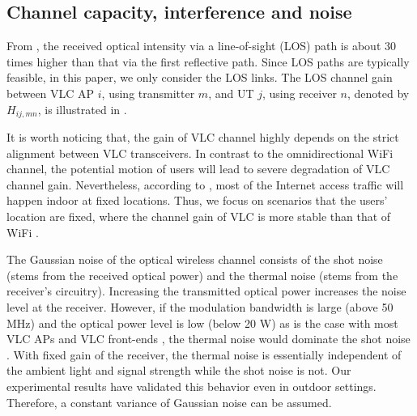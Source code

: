 \documentclass[10pt,journal]{IEEEtran}
\begin{document}
\subsection{Channel capacity, interference and noise}
From \cite{komine2004fundamental}, the received optical intensity via a line-of-sight (LOS) path is about 30 times higher than that via the first reflective path. Since LOS paths are typically feasible, in this paper, we only consider the LOS links. The LOS channel gain between VLC AP $i$, using transmitter $m$, and UT $j$, using receiver $n$, denoted by $H_{ij,mn}$, is illustrated in \cite{komine2004fundamental}.

It is worth noticing that, the gain of VLC channel highly depends on the strict alignment between VLC transceivers. In contrast to the omnidirectional WiFi channel, the potential motion of users will lead to severe degradation of VLC channel gain. Nevertheless, according to \cite{Cisco2015service}, most of the Internet access traffic will happen indoor at fixed locations. Thus, we focus on scenarios that the users' location are fixed, where the channel gain of VLC is more stable than that of WiFi \cite{zhang2015dancing}.

The Gaussian noise of the optical wireless channel consists of the shot noise (stems from the received optical power) and the thermal noise (stems from the receiver's circuitry). Increasing the transmitted optical power increases the noise level at the receiver. However, if the modulation bandwidth is large (above 50 MHz) and the optical power level is low (below 20 W) as is the case with most VLC APs and VLC front-ends \cite{langer2013optoelectronics}, the thermal noise would dominate the shot noise \cite{komine2004fundamental}. With fixed gain of the receiver, the thermal noise is essentially independent of the ambient light and signal strength while the shot noise is not. Our experimental results \cite{shao2015analysis,shao2015design} have validated this behavior even in outdoor settings. Therefore, a constant variance of Gaussian noise can be assumed.
\end{document}
